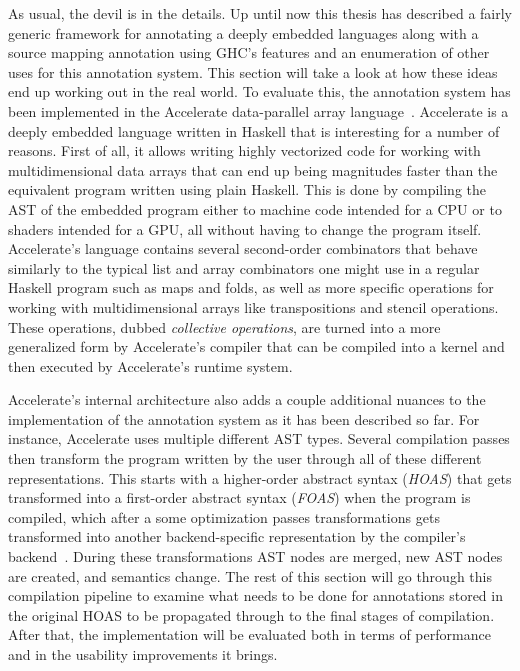 \documentclass[fontsize=11pt,a4paper,parskip=half,numbers=noenddot]{scrartcl}
\begin{document}
As usual, the devil is in the details. Up until now this thesis has described a
fairly generic framework for annotating a deeply embedded languages along with a
source mapping annotation using GHC's features and an enumeration of other uses
for this annotation system. This section will take a look at how these ideas end
up working out in the real world. To evaluate this, the annotation system has
been implemented in the Accelerate data-parallel array
language~\cite{mcdonell2013optimising}. Accelerate is a deeply embedded language
written in Haskell that is interesting for a number of reasons. First of all, it
allows writing highly vectorized code for working with multidimensional data
arrays that can end up being magnitudes faster than the equivalent program
written using plain Haskell. This is done by compiling the AST of the embedded
program either to machine code intended for a CPU or to shaders intended for a
GPU, all without having to change the program itself. Accelerate's language
contains several second-order combinators that behave similarly to the typical
list and array combinators one might use in a regular Haskell program such as
maps and folds, as well as more specific operations for working with
multidimensional arrays like transpositions and stencil operations. These
operations, dubbed \emph{collective operations}, are turned into a more
generalized form by Accelerate's compiler that can be compiled into a kernel and
then executed by Accelerate's runtime system.

Accelerate's internal architecture also adds a couple additional nuances to the
implementation of the annotation system as it has been described so far. For
instance, Accelerate uses multiple different AST types. Several compilation
passes then transform the program written by the user through all of these
different representations. This starts with a higher-order abstract syntax
(\emph{HOAS}) that gets transformed into a first-order abstract syntax
(\emph{FOAS}) when the program is compiled, which after a some optimization
passes transformations gets transformed into another backend-specific
representation by the compiler's backend~\cite{chakravarty2011accelerating}.
During these transformations AST nodes are merged, new AST nodes are created,
and semantics change. The rest of this section will go through this compilation
pipeline to examine what needs to be done for annotations stored in the original
HOAS to be propagated through to the final stages of compilation. After that,
the implementation will be evaluated both in terms of performance and in the
usability improvements it brings.
\end{document}

